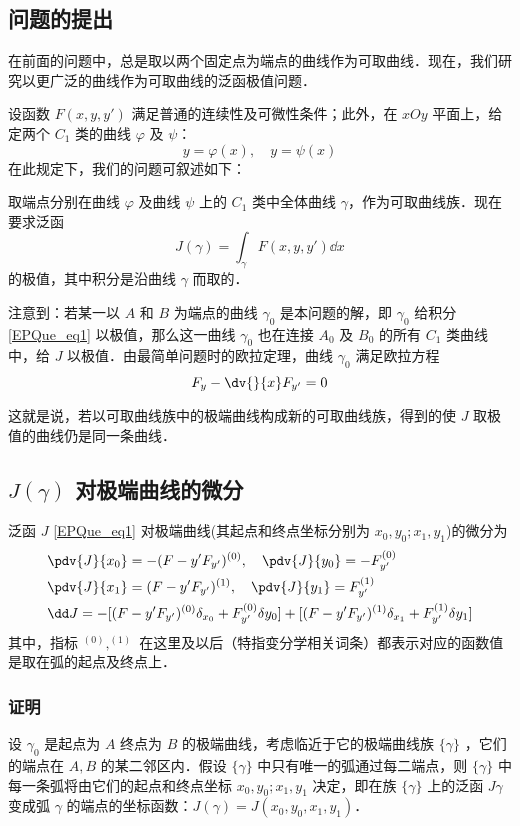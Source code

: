 
\begin{issues}
\issueTODO
\end{issues}

\subsection{问题的提出}在前面的问题中，总是取以两个固定点为端点的曲线作为可取曲线．现在，我们研究以更广泛的曲线作为可取曲线的泛函极值问题．

设函数 $F(x,y,y')$ 满足普通的连续性及可微性条件；此外，在 $xOy$ 平面上，给定两个 $C_1$ 类的曲线 $\varphi$ 及 $\psi$：
\begin{equation}
y=\varphi(x),\quad y=\psi(x)
\end{equation}
在此规定下，我们的问题可叙述如下：

取端点分别在曲线 $\varphi$ 及曲线 $\psi$ 上的 $C_1$ 类中全体曲线 $\gamma$，作为可取曲线族．现在要求泛函
\begin{equation}\label{EPQue_eq1}
J(\gamma)=\int_\gamma F(x,y,y')\dd x
\end{equation}
的极值，其中积分是沿曲线 $\gamma$ 而取的．

注意到：若某一以 $A$ 和 $B$ 为端点的曲线 $\gamma_0$ 是本问题的解，即 $\gamma_0$ 给积分\autoref{EPQue_eq1} 以极值，那么这一曲线 $\gamma_0$ 也在连接 $A_0$ 及 $B_0$ 的所有 $C_1$ 类曲线中，给 $J$ 以极值．由最简单问题时的欧拉定理，曲线 $\gamma_0$ 满足欧拉方程
\begin{equation}
F_y-\dv{}{x}F_{y'}=0
\end{equation}

这就是说，若以可取曲线族中的极端曲线构成新的可取曲线族，得到的使 $J$ 取极值的曲线仍是同一条曲线．
\subsection{$J(\gamma)$ 对极端曲线的微分} 
\begin{theorem}{}
泛函 $J$ \autoref{EPQue_eq1} 对极端曲线(其起点和终点坐标分别为 $x_0,y_0;x_1,y_1$)的微分为
\begin{equation}
\begin{aligned}
&\pdv{J}{x_0}=-(F-y'F_{y'})^{(0)},\quad \pdv{J}{y_0}=-F_{y'}^{(0)}\\
&\pdv{J}{x_1}=(F-y'F_{y'})^{(1)},\quad \pdv{J}{y_1}=F_{y'}^{(1)}\\
&\dd J=-[(F-y'F_{y'})^{(0)}\delta_{x_0}+ F_{y'}^{(0)}\delta y_0]+[(F-y'F_{y'})^{(1)}\delta_{x_1}+F_{y'}^{(1)}\delta y_1]
\end{aligned}
\end{equation}
其中，指标 $^{(0)},^{(1)}$ 在这里及以后（特指变分学相关词条）都表示对应的函数值是取在弧的起点及终点上．
\end{theorem}
\subsubsection{证明}
设 $\gamma_0$ 是起点为 $A$ 终点为 $B$ 的极端曲线，考虑临近于它的极端曲线族 $\{\gamma\}$ ，它们的端点在 $A,B$ 的某二邻区内．假设 $\{\gamma\}$ 中只有唯一的弧通过每二端点，则 $\{\gamma\}$ 中每一条弧将由它们的起点和终点坐标 $x_0,y_0;x_1,y_1$ 决定，即在族 $\{\gamma\}$ 上的泛函 $J{\gamma}$ 变成弧 $\gamma$ 的端点的坐标函数：$J(\gamma)=J(x_0,y_0,x_1,y_1)$．